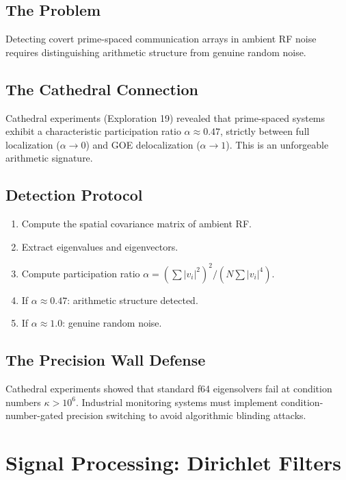 \documentclass[11pt,a4paper]{article}
\begin{document}
\subsection{The Problem}

Detecting covert prime-spaced communication arrays in ambient RF
noise requires distinguishing arithmetic structure from genuine
random noise.

\subsection{The Cathedral Connection}

Cathedral experiments (Exploration 19) revealed that prime-spaced
systems exhibit a characteristic participation ratio
$\alpha \approx 0.47$, strictly between full localization
($\alpha \to 0$) and GOE delocalization ($\alpha \to 1$). This
is an unforgeable arithmetic signature.

\subsection{Detection Protocol}

\begin{enumerate}
  \item Compute the spatial covariance matrix of ambient RF.
  \item Extract eigenvalues and eigenvectors.
  \item Compute participation ratio $\alpha = (\sum|v_i|^2)^2 / (N\sum|v_i|^4)$.
  \item If $\alpha \approx 0.47$: arithmetic structure detected.
  \item If $\alpha \approx 1.0$: genuine random noise.
\end{enumerate}

\subsection{The Precision Wall Defense}

Cathedral experiments showed that standard f64 eigensolvers fail
at condition numbers $\kappa > 10^6$. Industrial monitoring systems
must implement condition-number-gated precision switching to avoid
algorithmic blinding attacks.

\section{Signal Processing: Dirichlet Filters}
\end{document}
